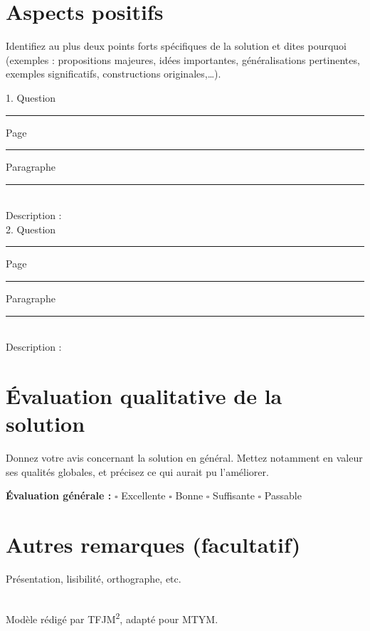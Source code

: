 \documentclass[11pt,a4paper]{article}
\newcommand{\blank}[1]{\rule{#1}{0.4pt}}
\newcommand{\smallblank}{\blank{2.2em}}
\begin{document}
\section*{Aspects positifs}

Identifiez au plus deux points forts spécifiques de la solution et
dites pourquoi (exemples : propositions majeures, idées importantes,
généralisations pertinentes, exemples significatifs, constructions
originales,\ldots).

\vspace{0.4em}
\newcommand{\positifEntry}[1]{%
  #1. Question \smallblank{} Page \smallblank{} Paragraphe \smallblank\\
  Description :\\[4em]
}
\positifEntry{1}
\positifEntry{2}

\section*{Évaluation qualitative de la solution}

Donnez votre avis concernant la solution en général. Mettez notamment
en valeur ses qualités globales, et précisez ce qui aurait pu
l'améliorer.

\vfill

\begin{center}
\textbf{Évaluation générale :} \quad
$\square$ Excellente \quad $\square$ Bonne \quad
$\square$ Suffisante \quad $\square$ Passable
\end{center}

\section*{Autres remarques (facultatif)}

Présentation, lisibilité, orthographe, etc.

\vfill
\hrulefill\\
\small Modèle rédigé par TFJM\textsuperscript{2}, adapté pour MTYM.
\end{document}
